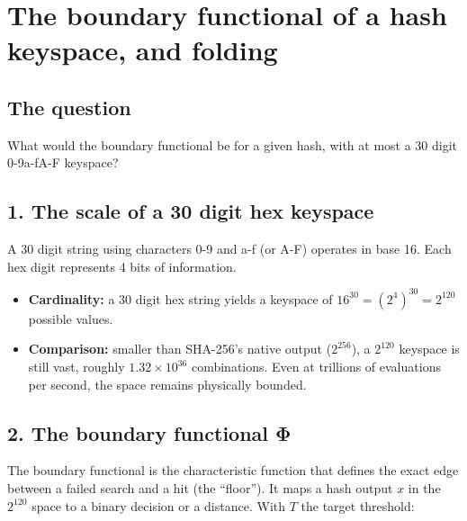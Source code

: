 \chapter{\texorpdfstring{The boundary functional of a hash keyspace, and folding}{The boundary functional of a hash keyspace, and folding}}
\label{chap:hash-boundary-functional-folding}

\section{\texorpdfstring{The question}{The question}}

What would the boundary functional be for a given hash, with at most a 30 digit 0-9a-fA-F keyspace?

\section{\texorpdfstring{1. The scale of a 30 digit hex keyspace}{1. The scale of a 30 digit hex keyspace}}

A 30 digit string using characters 0-9 and a-f (or A-F) operates in base 16. Each hex digit represents 4 bits of information.

\begin{itemize}
\item \textbf{Cardinality:} a 30 digit hex string yields a keyspace of \(16^{30} = (2^4)^{30} = 2^{120}\) possible values.
\item \textbf{Comparison:} smaller than SHA-256's native output (\(2^{256}\)), a \(2^{120}\) keyspace is still vast, roughly \(1.32 \times 10^{36}\) combinations. Even at trillions of evaluations per second, the space remains physically bounded.
\end{itemize}

\section{\texorpdfstring{2. The boundary functional Φ}{2. The boundary functional Φ}}

The boundary functional is the characteristic function that defines the exact edge between a failed search and a hit (the “floor”). It maps a hash output \(x\) in the \(2^{120}\) space to a binary decision or a distance. With \(T\) the target threshold:

